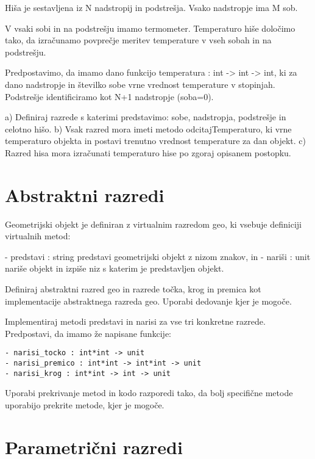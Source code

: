 \begin{ex}
Hi\v sa je sestavljena iz N nadstropij in podstre\v sja. Vsako nadstropje ima M sob.

V vsaki sobi in na podstre\v sju imamo termometer. Temperaturo hi\v se dolo\v cimo tako, da izra\v cunamo povpre\v cje meritev temperature v vseh sobah in na podstre\v sju. 

Predpostavimo, da imamo dano funkcijo temperatura : int -> int -> int, ki za dano nadstropje in \v stevilko sobe vrne vrednost temperature v stopinjah. Podstre\v sje identificiramo kot N+1 nadstropje (soba=0).

a) Definiraj razrede s katerimi predstavimo: sobe, nadstropja, podstre\v sje in celotno hi\v so.
b) Vsak razred mora imeti metodo odcitajTemperaturo, ki vrne temperaturo objekta in postavi trenutno vrednost temperature za dan objekt.
c) Razred hisa mora izra\v cunati temperaturo hise po zgoraj opisanem postopku.





\section{Abstraktni razredi}


\end{ex}
\begin{ex}
Geometrijski objekt je definiran z virtualnim razredom geo, ki vsebuje
definiciji virtualnih metod:

- predstavi : string
  predstavi geometrijski objekt z nizom znakov, in 
- nari\v si : unit 
  nari\v se objekt in izpi\v se niz s katerim je predstavljen objekt. 

Definiraj abstraktni razred geo in razrede to\v cka, krog in premica kot
implementacije abstraktnega razreda geo. Uporabi dedovanje kjer je mogo\v ce. 

Implementiraj metodi predstavi in narisi za vse tri konkretne razrede. 
Predpostavi, da imamo \v ze napisane funkcije: 
\begin{lstlisting}
- narisi_tocko : int*int -> unit
- narisi_premico : int*int -> int*int -> unit
- narisi_krog : int*int -> int -> unit
\end{lstlisting}

Uporabi prekrivanje metod in kodo razporedi tako, da bolj specifi\v cne metode uporabijo prekrite metode, kjer je mogo\v ce.





\section{Parametri\v cni razredi}


\end{ex}
